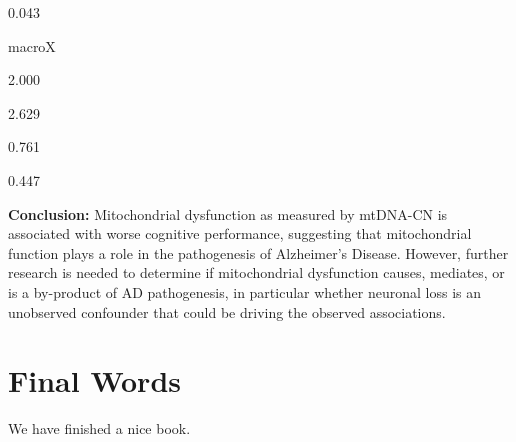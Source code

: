 \documentclass[]{book}
\begin{document}
0.043

macroX

2.000

2.629

0.761

0.447

\textbf{Conclusion:} Mitochondrial dysfunction as measured by mtDNA-CN is associated with worse cognitive performance, suggesting that mitochondrial function plays a role in the pathogenesis of Alzheimer's Disease. However, further research is needed to determine if mitochondrial dysfunction causes, mediates, or is a by-product of AD pathogenesis, in particular whether neuronal loss is an unobserved confounder that could be driving the observed associations.

\hypertarget{final-words}{%
\chapter{Final Words}\label{final-words}}

We have finished a nice book.


\end{document}
